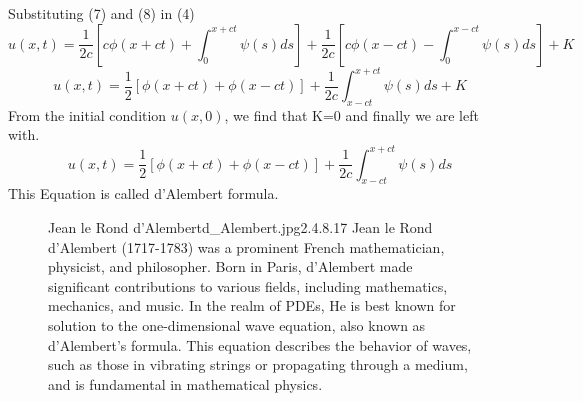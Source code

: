 \documentclass[]{article}
\begin{document}
Substituting (7) and (8) in (4)
\[
    u\left(x,t\right) = \frac{1}{2c}\left[c\phi\left(x+ct\right)+\int_{0}^{x+ct} \psi\left(s\right)ds\right]+\frac{1}{2c}\left[c\phi\left(x-ct\right)-\int_{0}^{x-ct} \psi\left(s\right)ds\right]+K    
\]
\[
    u\left(x,t\right) = \frac{1}{2}\left[\phi\left(x+ct\right)+\phi\left(x-ct\right)\right]+\frac{1}{2c}\int_{x-ct}^{x+ct} \psi\left(s\right)ds + K    
\]
From the initial condition $u(x,0)$, we find that K=0 and finally we are left with.
\[
    u\left(x,t\right) = \frac{1}{2}\left[\phi\left(x+ct\right)+\phi\left(x-ct\right)\right]+\frac{1}{2c}\int_{x-ct}^{x+ct} \psi\left(s\right)ds    
\]
This Equation is called d'Alembert formula.
\begin{figure}[b]
    \begin{enrichment}{Jean le Rond d'Alembert}{d_Alembert.jpg}{2.4}{.8}{.17}
        Jean le Rond d'Alembert (1717-1783) was a prominent French mathematician, physicist, and philosopher. Born in Paris, d'Alembert made significant contributions to various fields, including mathematics, mechanics, and music.
        In the realm of PDEs, He is best known for solution to the one-dimensional wave equation, also known as d'Alembert's formula. This equation describes the behavior of waves, such as those in vibrating strings or propagating through a medium, and is fundamental in mathematical physics.
    \end{enrichment}    
\end{figure}
\newpage
\setcounter{equation}{0}
\end{document}
